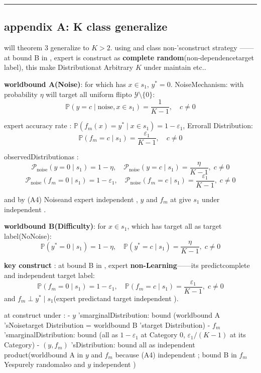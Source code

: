 \documentclass[
  12pt,
]{article}
\begin{document}
\begin{center}\rule{0.5\linewidth}{0.5pt}\end{center}

\subsection{appendix A: K class generalize }\label{ux9644ux5f55-ak-ux7c7bux63a8ux5e7f}

will theorem  3 generalize to  \(K > 2\). using and class non-'sconstruct strategy ------at bound  B
in , expert is construct as \textbf{complete random}(non-dependencetarget label), this make Distributionat Arbitrary
\(K\) under maintain etc.. 

\textbf{worldbound  A(Noise)}: for which has 
\(x \in s_1\), \(y^* = 0\). NoiseMechanism: with probability \(\eta\) will target all uniform flipto 
\(\mathcal{Y} \setminus \{0\}\): 
\[\mathbb{P}(y = c \mid \text{noise}, x \in s_1) = \frac{1}{K-1}, \quad c \neq 0\]

expert accuracy rate : \(\mathbb{P}(f_m(x) = y^* \mid x \in s_1) = 1 - \varepsilon_1\), Errorall Distribution: 
\[\mathbb{P}(f_m = c \mid s_1) = \frac{\varepsilon_1}{K-1}, \quad c \neq 0\]

observedDistributionas : 
\[\mathcal{P}_{\text{noise}}(y = 0 \mid s_1) = 1 - \eta, \quad \mathcal{P}_{\text{noise}}(y = c \mid s_1) = \frac{\eta}{K-1}, \; c \neq 0\]
\[\mathcal{P}_{\text{noise}}(f_m = 0 \mid s_1) = 1 - \varepsilon_1, \quad \mathcal{P}_{\text{noise}}(f_m = c \mid s_1) = \frac{\varepsilon_1}{K-1}, \; c \neq 0\]

and by  (A4) Noiseand expert independent , \(y\) and  \(f_m\) at give  \(s_1\) under independent . 

\textbf{worldbound  B(Difficulty)}: for 
\(x \in s_1\), which has target all as target label(NoNoise):
\[\mathbb{P}(y^* = 0 \mid s_1) = 1 - \eta, \quad \mathbb{P}(y^* = c \mid s_1) = \frac{\eta}{K-1}, \; c \neq 0\]

\textbf{key construct }: at bound  B
in , expert \textbf{non-Learning}------its predictcomplete and independent target label: 
\[\mathbb{P}(f_m = 0 \mid s_1) = 1 - \varepsilon_1, \quad \mathbb{P}(f_m = c \mid s_1) = \frac{\varepsilon_1}{K-1}, \; c \neq 0\]
and  \(f_m \perp y^* \mid s_1\)(expert predictand target independent ). 

at construct under :  - \(y\) 'smarginalDistribution: bound (worldbound  A 'sNoisetarget Distribution =
worldbound  B 'starget Distribution) - \(f_m\) 'smarginalDistribution: bound (all as 
\(1-\varepsilon_1\) at Category 0, \(\varepsilon_1/(K-1)\) at its Category) -
\((y, f_m)\) 'sDistribution: bound all as independent product(worldbound  A in  \(y\) and  \(f_m\)
because  (A4) independent ; bound  B in  \(f_m\) Yespurely randomalso and  \(y\) independent )
\end{document}
